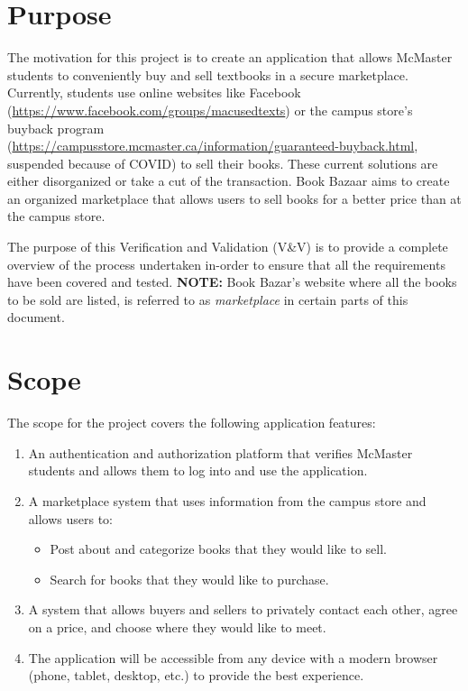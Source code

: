 \documentclass[fullpage]{article}
\newcommand{\be}{\begin{enumerate}}
\newcommand{\ee}{\end{enumerate}}
\newcommand{\bi}{\begin{itemize}}
\newcommand{\ei}{\end{itemize}}
\begin{document}
\section{Purpose}
The motivation for this project is to create an application that allows McMaster students to conveniently buy and sell textbooks in a secure marketplace. Currently, students use online websites like Facebook (\url{https://www.facebook.com/groups/macusedtexts}) or the campus store's buyback program \\ (\url{https://campusstore.mcmaster.ca/information/guaranteed-buyback.html}, suspended because of COVID) to sell their books. These current solutions are either disorganized or take a cut of the transaction. Book Bazaar aims to create an organized marketplace that allows users to sell books for a better price than at the campus store.

The purpose of this Verification and Validation (V\&V) is to provide a complete overview of the process undertaken in-order to ensure that all the requirements have been covered and tested. 
\newline
\small{ \textbf{NOTE:} Book Bazar's website where all the books to be sold are listed, is referred to as \textit{marketplace} in certain parts of this document.}

\section{Scope}
The scope for the project covers the following application features:
\be
	\item An authentication and authorization platform that verifies McMaster students and allows them to log into and use the application.
	\item A marketplace system that uses information from the campus store and allows users to:
		\bi
			\item Post about and categorize books that they would like to sell.
			\item Search for books that they would like to purchase.
		\ei
	\item A system that allows buyers and sellers to privately contact each other, agree on a price, and choose where they would like to meet.
	\item The application will be accessible from any device with a modern browser (phone, tablet, desktop, etc.) to provide the best experience.
\ee
\end{document}
